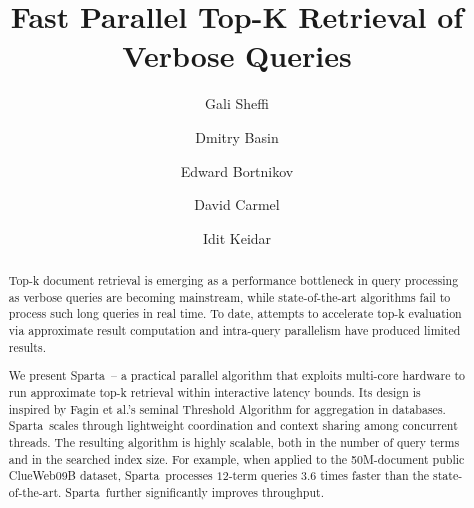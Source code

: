 \documentclass[sigconf,review,anonymous]{acmart}
\title{Fast Parallel Top-K Retrieval of Verbose Queries}
\author{Gali Sheffi}%
\author{Dmitry Basin}%
\author{Edward Bortnikov}%
\author{David Carmel}%
\author{Idit Keidar}%
\newcommand{\alg}{Sparta}
\newcommand{\inred}[1]{{\color{red}{#1}}}
\begin{document}
\begin{abstract}
Top-k document retrieval is emerging as a performance bottleneck in query processing as verbose queries are becoming 
mainstream, while state-of-the-art algorithms fail to process such long queries in real time. To date, attempts to
accelerate top-k evaluation 
via approximate result computation and intra-query parallelism have produced limited results. 

We present \alg\ -- a practical parallel algorithm that exploits multi-core hardware to run approximate top-k retrieval 
within interactive latency bounds. Its design is inspired by  Fagin et al.'s seminal Threshold Algorithm for  aggregation in databases. 
\alg\ scales through lightweight coordination and context sharing among concurrent threads. The resulting algorithm 
is highly scalable, 
both in the number of query terms and in the searched index size. For example, when applied to the 50M-document public ClueWeb09B 
dataset, \alg\  processes $12$-term queries $3.6$ times faster than the state-of-the-art. 
\inred{
On a tenfold  bigger index, 
\alg\ continues to process queries at the same speed, whereas today's best-in-class algorithm is more than 60 times slower. 
}
\alg\ further significantly improves throughput.%
\end{abstract}


\maketitle








\clearpage

  
\end{document}
